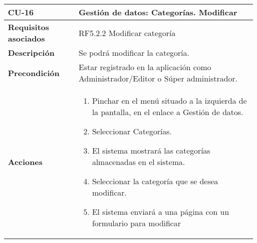\newpage
\begin{longtable}[H]{@{}ll@{}}
\toprule
\begin{minipage}[b]{0.23\columnwidth}\raggedright\strut
\textbf{CU-16}\strut
\end{minipage} & \begin{minipage}[b]{0.71\columnwidth}\raggedright\strut
\textbf{Gestión de datos: Categorías. Modificar}\strut
\end{minipage}\tabularnewline
\midrule
\endhead
\begin{minipage}[t]{0.23\columnwidth}\raggedright\strut
\textbf{Requisitos asociados}\strut
\end{minipage} & \begin{minipage}[t]{0.71\columnwidth}\raggedright\strut
RF5.2.2 Modificar categoría\strut
\end{minipage}\tabularnewline
\begin{minipage}[t]{0.23\columnwidth}\raggedright\strut
\textbf{Descripción}\strut
\end{minipage} & \begin{minipage}[t]{0.71\columnwidth}\raggedright\strut
Se podrá modificar la categoría.
\strut
\end{minipage}\tabularnewline
\begin{minipage}[t]{0.23\columnwidth}\raggedright\strut
\textbf{Precondición}\strut
\end{minipage} & \begin{minipage}[t]{0.71\columnwidth}\raggedright\strut
Estar registrado en la aplicación como Administrador/Editor o Súper administrador.\strut
\end{minipage}\tabularnewline
\begin{minipage}[t]{0.23\columnwidth}\raggedright\strut
\textbf{Acciones}\strut
\end{minipage} & \begin{minipage}[t]{0.71\columnwidth}\raggedright\strut
\begin{enumerate}
\def\labelenumi{\arabic{enumi}.}
\tightlist
\item
Pinchar en el menú situado a la izquierda de la pantalla, en el
enlace a Gestión de datos.
\item
Seleccionar Categorías.
\item
El sistema mostrará las categorías almacenadas en el sistema.
\item
Seleccionar la categoría que se desea modificar.
\item
El sistema enviará a una página con un formulario para modificar

\end{enumerate}
\end{minipage}
\end{longtable}
